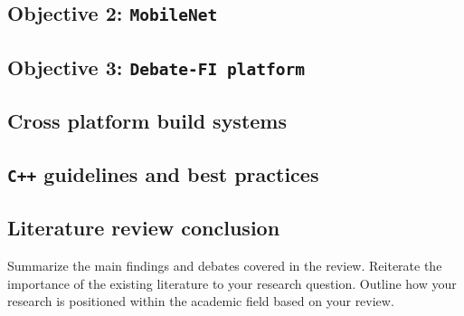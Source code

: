 \subsection{Objective 2: \texttt{MobileNet}}
\subsection{Objective 3: \texttt{Debate-FI platform}}
\subsection{Cross platform build systems}
\subsection{\texttt{C++} guidelines and best practices}

\subsection{Literature review conclusion}
Summarize the main findings and debates covered in the review.
Reiterate the importance of the existing literature to your research question.
Outline how your research is positioned within the academic field based on your review.

